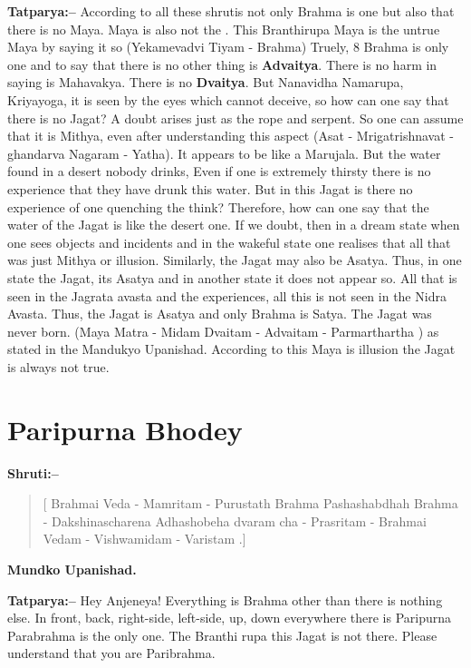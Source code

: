 \textbf{Tatparya:–} According to all these shrutis not only Brahma is one but also that there is no Maya. Maya is also not the . This Branthirupa Maya is the untrue Maya by saying it so (Yekamevadvi Tiyam - Brahma) Truely, 8 Brahma is only one and to say that there is no other thing is \textbf{Advaitya}. There is no harm in saying is Mahavakya. There is no \textbf{Dvaitya}. But Nanavidha Namarupa, Kriyayoga, it is seen by the eyes which cannot deceive, so how can one say that there is no Jagat? A doubt arises just as the rope and serpent. So one can assume that it is Mithya, even after understanding this aspect (Asat - Mrigatrishnavat - ghandarva Nagaram - Yatha). It appears to be like a Marujala. But the water found in a desert nobody drinks, Even if one is extremely thirsty there is no experience that they have drunk this water. But in this Jagat is there no experience of one quenching the think? Therefore, how can one say that the water of the Jagat is like the desert one. If we doubt, then in a dream state when one sees objects and incidents and in the wakeful state one realises that all that was just Mithya or illusion. Similarly, the Jagat may also be Asatya. Thus, in one state the Jagat, its Asatya and in another state it does not appear so. All that is seen in the Jagrata avasta and the experiences, all this is not seen in the Nidra Avasta. Thus, the Jagat is Asatya and only Brahma is Satya. The Jagat was never born. (Maya Matra - Midam Dvaitam - Advaitam - Parmarthartha ) as stated in the Mandukyo Upanishad. According to this Maya is illusion the Jagat is always not true.

\chapter{Paripurna Bhodey}

\textbf{Shruti:–}

\begin{verse}
[ Brahmai Veda - Mamritam - Purustath Brahma Pashashabdhah Brahma - Dakshinascharena  Adhashobeha dvaram cha - Prasritam - Brahmai Vedam - Vishwamidam - Varistam .]
\end{verse}

\begin{flushright}
\textbf{Mundko Upanishad.}
\end{flushright}

\textbf{Tatparya:–} Hey Anjeneya! Everything is Brahma other than there is nothing else. In front, back, right-side, left-side, up, down everywhere there is Paripurna Parabrahma is the only one. The Branthi rupa this Jagat is not there. Please understand that you are Paribrahma.

